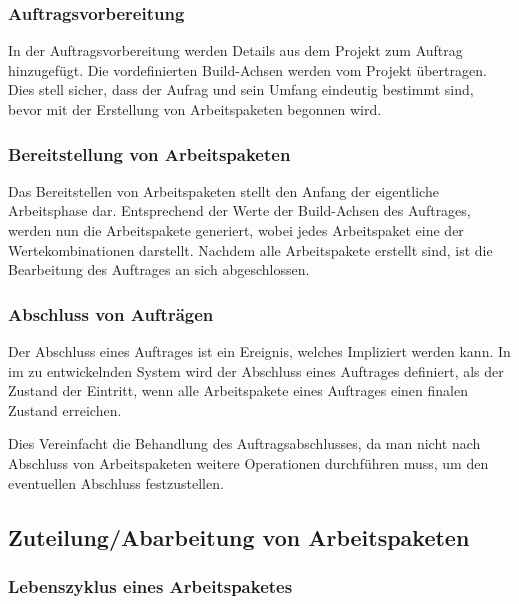\subsubsection{Auftragsvorbereitung}

In der Auftragsvorbereitung werden Details aus dem Projekt zum Auftrag hinzugefügt.
Die vordefinierten Build-Achsen werden vom Projekt übertragen.
Dies stell sicher, dass der Aufrag und sein Umfang eindeutig bestimmt sind,
bevor mit der Erstellung von Arbeitspaketen begonnen wird.


\subsubsection{Bereitstellung von Arbeitspaketen}

Das Bereitstellen von Arbeitspaketen stellt den Anfang der eigentliche Arbeitsphase dar.
Entsprechend der Werte der Build-Achsen des Auftrages, werden nun die Arbeitspakete generiert,
wobei jedes Arbeitspaket eine der Wertekombinationen darstellt.
Nachdem alle Arbeitspakete erstellt sind, ist die Bearbeitung des Auftrages an sich abgeschlossen.

\subsubsection{Abschluss von Aufträgen}

Der Abschluss eines Auftrages ist ein Ereignis, welches Impliziert werden kann.
In im zu entwickelnden System wird der Abschluss eines Auftrages definiert,
als der Zustand der Eintritt, wenn alle Arbeitspakete eines Auftrages
einen finalen Zustand erreichen.

Dies Vereinfacht die Behandlung des Auftragsabschlusses,
da man nicht nach Abschluss von Arbeitspaketen weitere Operationen durchführen muss,
um den eventuellen Abschluss festzustellen.

\subsection{Zuteilung/Abarbeitung von Arbeitspaketen}


\subsubsection{Lebenszyklus eines Arbeitspaketes}


